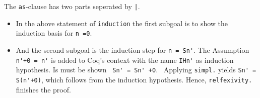 The \lstinline!as!-clause has two parts seperated by \lstinline!|!.
\begin{itemize}
	\item In the above statement of \lstinline!induction! the first subgoal is to show the induction basis for \lstinline!n =0!.
	\item And the second subgoal is the induction step for \lstinline!n = Sn'!.
	      The Assumption \lstinline!n'+0 = n'! is added to Coq's context with the name \lstinline!IHn'! as induction hypothesis.
		  Is must be shown \lstinline! Sn' = Sn' +0!. \
          Applying \lstinline!simpl.! yields \lstinline!Sn' = S(n'+0)!, which follows from the induction hypothesis. 
          Hence, \lstinline!relfexivity.! finishes the proof.
\end{itemize} 




